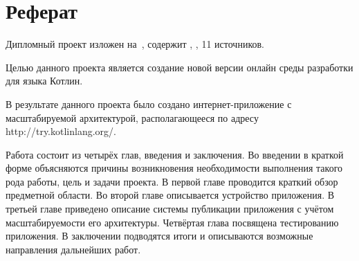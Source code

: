 \chapter*{Реферат}

	Дипломный проект изложен на~, содержит , , 11 источников.

	Целью данного проекта является создание новой версии онлайн среды разработки для языка Котлин.

	В результате данного проекта было создано интернет-приложение с масштабируемой архитектурой, располагающееся по адресу\\ http://try.kotlinlang.org/. 
	
	Работа состоит из четырёх глав, введения и заключения.
Во введении в краткой форме объясняются причины возникновения необходимости выполнения такого рода работы, цель и задачи проекта.
В первой главе проводится краткий обзор предметной области.
Во второй главе описывается устройство приложения.
В третьей главе приведено описание системы публикации приложения с учётом масштабируемости его архитектуры.
Четвёртая глава посвящена тестированию приложения.
В заключении подводятся итоги и описываются возможные направления дальнейших работ.

\clearpage
